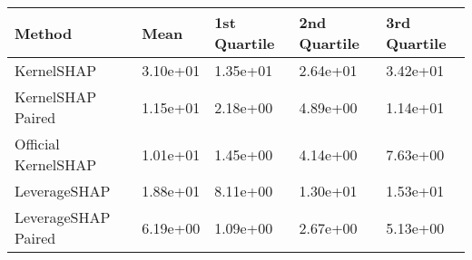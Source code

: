 \begin{tabular}{lllll}
  \toprule
  \textbf{Method} & \textbf{Mean} & \textbf{1st Quartile} & \textbf{2nd Quartile} & \textbf{3rd Quartile} \\ \midrule 
KernelSHAP & 3.10e+01 & 1.35e+01 & 2.64e+01 & 3.42e+01\\
KernelSHAP Paired & \cellcolor{bronze!60}1.15e+01 & \cellcolor{bronze!60}2.18e+00 & \cellcolor{bronze!60}4.89e+00 & \cellcolor{bronze!60}1.14e+01\\
Official KernelSHAP & \cellcolor{silver!60}1.01e+01 & \cellcolor{silver!60}1.45e+00 & \cellcolor{silver!60}4.14e+00 & \cellcolor{silver!60}7.63e+00\\
LeverageSHAP & 1.88e+01 & 8.11e+00 & 1.30e+01 & 1.53e+01\\
LeverageSHAP Paired & \cellcolor{gold!60}6.19e+00 & \cellcolor{gold!60}1.09e+00 & \cellcolor{gold!60}2.67e+00 & \cellcolor{gold!60}5.13e+00\\
\bottomrule
\end{tabular}